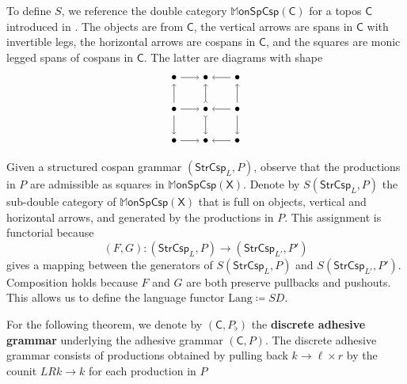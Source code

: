 \documentclass{amsart}
\newcommand{\C}{\cat{C}}
\newcommand{\X}{\cat{X}}
\newcommand{\StrCsp}{\cat{StrCsp}}
\newcommand{\MonSpCsp}{\dblcat{M} \cat{onSpCsp}}
\newcommand{\Lang}{\mathrm{Lang}}
\newcommand{\defn}[1]{\textbf{#1}}
\newcommand{\cat}[1]{\mathsf{#1}}
\newcommand{\dblcat}[1]{\mathbb{#1}}
\newcommand{\from}{\colon}
\theoremstyle{remark}
\theoremstyle{definition}
\begin{document}
To define $ S $, we reference the double category $ \MonSpCsp (\C) $
for a topos $ \C $ introduced in \cite{CicCour_SpCspTopos}.  The
objects are from $ \C $, the vertical arrows are spans in $ \C $ with
invertible legs, the horizontal arrows are cospans in $ \C $, and the
squares are monic legged spans of cospans in $ \C $. The latter are
diagrams with shape
%
\[
\begin{tikzpicture}
  \node (00) at (0,0) {$ \bullet $};
  \node (01) at (0,1) {$ \bullet $};
  \node (02) at (0,2) {$ \bullet $};
  \node (10) at (1,0) {$ \bullet $};
  \node (11) at (1,1) {$ \bullet $};
  \node (12) at (1,2) {$ \bullet $};
  \node (20) at (2,0) {$ \bullet $};
  \node (21) at (2,1) {$ \bullet $};
  \node (22) at (2,2) {$ \bullet $};
  \draw [->] (02) to node [] {\scriptsize{$  $}} (12);
  \draw [->] (22) to node [] {\scriptsize{$  $}} (12);
  \draw [->] (01) to node [] {\scriptsize{$  $}} (11);
  \draw [->] (21) to node [] {\scriptsize{$  $}} (11);
  \draw [->] (00) to node [] {\scriptsize{$  $}} (10);
  \draw [->] (20) to node [] {\scriptsize{$  $}} (10);
  \draw [->] (01) to node [] {\scriptsize{$  $}} (02);
  \draw [->] (01) to node [] {\scriptsize{$  $}} (00);
  \draw [>->] (11) to node [] {\scriptsize{$  $}} (12);
  \draw [>->] (11) to node [] {\scriptsize{$  $}} (10);
  \draw [->] (21) to node [] {\scriptsize{$  $}} (22);
  \draw [->] (21) to node [] {\scriptsize{$  $}} (20);
\end{tikzpicture}
\]
%

Given a structured cospan grammar $ ( \StrCsp_L , P ) $, observe that
the productions in $ P $ are admissible as squares in
$ \MonSpCsp (\X) $. Denote by $ S ( \StrCsp_L , P ) $ the sub-double
category of $ \MonSpCsp ( \X ) $ that is full on objects, vertical and
horizontal arrows, and generated by the productions in
$ P $. This assignment is functorial
%
%
because
%
\[
  (F,G) \from ( \StrCsp_{L} , P ) \to ( \StrCsp_{L'} , P' )
\]
% 
gives a mapping between the generators of $ S ( \StrCsp_{L} , P ) $
and $ S ( \StrCsp_{L'} , P' ) $.  Composition holds because
$ F $ and $ G $ are both preserve pullbacks and pushouts. This allows
us to define the language functor $ \Lang \coloneqq SD $.  

For the following theorem, we denote by $ ( \C , P_{\flat} ) $ the
\defn{discrete adhesive grammar} underlying the adhesive grammar $ (
\C , P ) $. The discrete adhesive grammar consists of productions
obtained by pulling back $ k \to \ell \times r $ by the counit $
LRk \to k $ for each production in $ P $
\end{document}
